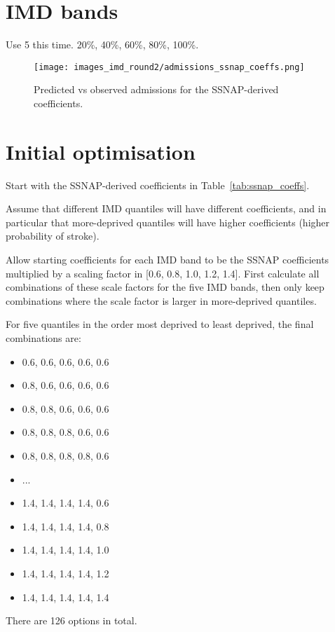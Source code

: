 \documentclass[12pt]{extarticle}
\begin{document}
\section{IMD bands}

Use 5 this time. 20\%, 40\%, 60\%, 80\%, 100\%.

\begin{figure}
    \centering
    \texttt{[image: images\_imd\_round2/admissions\_ssnap\_coeffs.png]}
    \caption{Predicted vs observed admissions for the SSNAP-derived coefficients.}
    \label{fig:scatter_admissions_ssnap_coeffs}
\end{figure}

\section{Initial optimisation}

Start with the SSNAP-derived coefficients in Table~\ref{tab:ssnap_coeffs}.

Assume that different IMD quantiles will have different coefficients, and in particular that more-deprived quantiles will have higher coefficients (higher probability of stroke). 

Allow starting coefficients for each IMD band to be the SSNAP coefficients multiplied by a scaling factor in [0.6, 0.8, 1.0, 1.2, 1.4].
First calculate all combinations of these scale factors for the five IMD bands, then only keep combinations where the scale factor is larger in more-deprived quantiles.

For five quantiles in the order most deprived to least deprived, the final combinations are:
\begin{itemize}
    \item 0.6, 0.6, 0.6, 0.6, 0.6
    \item 0.8, 0.6, 0.6, 0.6, 0.6
    \item 0.8, 0.8, 0.6, 0.6, 0.6
    \item 0.8, 0.8, 0.8, 0.6, 0.6
    \item 0.8, 0.8, 0.8, 0.8, 0.6
    \item ...
    \item 1.4, 1.4, 1.4, 1.4, 0.6
    \item 1.4, 1.4, 1.4, 1.4, 0.8
    \item 1.4, 1.4, 1.4, 1.4, 1.0
    \item 1.4, 1.4, 1.4, 1.4, 1.2
    \item 1.4, 1.4, 1.4, 1.4, 1.4
\end{itemize}
There are 126 options in total.
\end{document}
